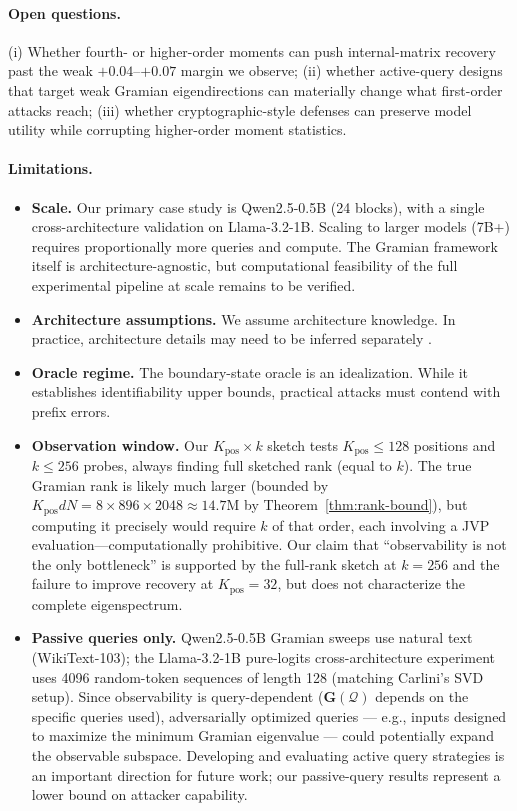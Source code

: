 \documentclass{article}
\newcommand{\cQ}{\mathcal{Q}}
\newcommand{\bG}{\mathbf{G}}
\begin{document}
\paragraph{Open questions.} (i) Whether fourth- or higher-order moments can push internal-matrix recovery past the weak $+0.04$--$+0.07$ margin we observe; (ii) whether active-query designs that target weak Gramian eigendirections can materially change what first-order attacks reach; (iii) whether cryptographic-style defenses can preserve model utility while corrupting higher-order moment statistics.

\paragraph{Limitations.}

\begin{itemize}
 \item \textbf{Scale.} Our primary case study is Qwen2.5-0.5B (24 blocks), with a single cross-architecture validation on Llama-3.2-1B. Scaling to larger models (7B+) requires proportionally more queries and compute. The Gramian framework itself is architecture-agnostic, but computational feasibility of the full experimental pipeline at scale remains to be verified.
 \item \textbf{Architecture assumptions.} We assume architecture knowledge. In practice, architecture details may need to be inferred separately \citep{oh2019towards}.
 \item \textbf{Oracle regime.} The boundary-state oracle is an idealization. While it establishes identifiability upper bounds, practical attacks must contend with prefix errors.
 \item \textbf{Observation window.} Our $K_{\text{pos}}\times k$ sketch tests $K_{\text{pos}} \leq 128$ positions and $k \leq 256$ probes, always finding full sketched rank (equal to $k$). The true Gramian rank is likely much larger (bounded by $K_{\text{pos}} d N = 8 \times 896 \times 2048 \approx 14.7\text{M}$ by Theorem~\ref{thm:rank-bound}), but computing it precisely would require $k$ of that order, each involving a JVP evaluation---computationally prohibitive. Our claim that ``observability is not the only bottleneck'' is supported by the full-rank sketch at $k{=}256$ and the failure to improve recovery at $K_{\text{pos}}{=}32$, but does not characterize the complete eigenspectrum.
 \item \textbf{Passive queries only.} Qwen2.5-0.5B Gramian sweeps use natural text (WikiText-103); the Llama-3.2-1B pure-logits cross-architecture experiment uses 4096 random-token sequences of length 128 (matching Carlini's SVD setup). Since observability is query-dependent ($\bG(\cQ)$ depends on the specific queries used), adversarially optimized queries --- e.g., inputs designed to maximize the minimum Gramian eigenvalue --- could potentially expand the observable subspace. Developing and evaluating active query strategies is an important direction for future work; our passive-query results represent a lower bound on attacker capability.

\end{itemize}
\end{document}
